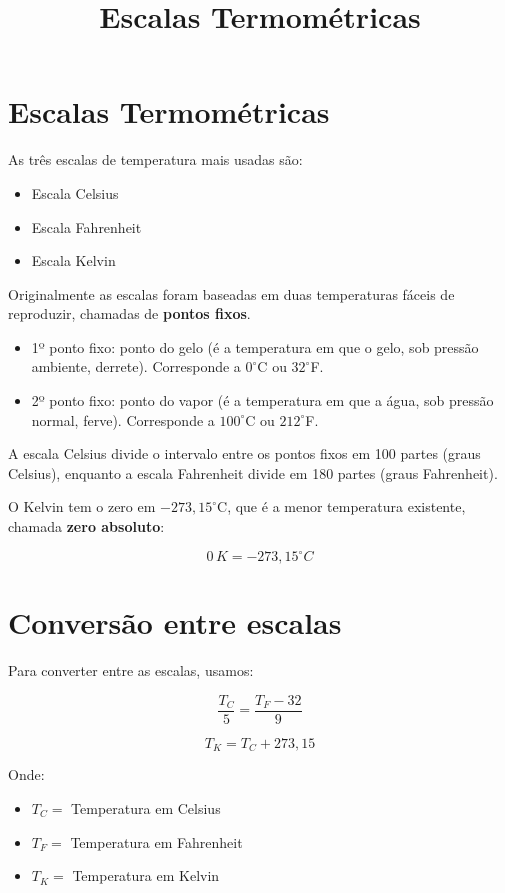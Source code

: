 \documentclass[a4paper,12pt]{article}
\title{Escalas Termométricas}
\author{}
\date{}
\begin{document}
\maketitle

\section*{Escalas Termométricas}

As três escalas de temperatura mais usadas são:
\begin{itemize}
    \item Escala Celsius
    \item Escala Fahrenheit
    \item Escala Kelvin
\end{itemize}

Originalmente as escalas foram baseadas em duas temperaturas fáceis de reproduzir, chamadas de \textbf{pontos fixos}.

\begin{itemize}
    \item 1º ponto fixo: ponto do gelo (é a temperatura em que o gelo, sob pressão ambiente, derrete).  
    Corresponde a $0^\circ$C ou $32^\circ$F.
    \item 2º ponto fixo: ponto do vapor (é a temperatura em que a água, sob pressão normal, ferve).  
    Corresponde a $100^\circ$C ou $212^\circ$F.
\end{itemize}

A escala Celsius divide o intervalo entre os pontos fixos em 100 partes (graus Celsius), enquanto a escala Fahrenheit divide em 180 partes (graus Fahrenheit).  

O Kelvin tem o zero em $-273{,}15^\circ$C, que é a menor temperatura existente, chamada \textbf{zero absoluto}:

\[
0\,K = -273{,}15^\circ C
\]

\section*{Conversão entre escalas}

Para converter entre as escalas, usamos:

\[
\frac{T_C}{5} = \frac{T_F - 32}{9}
\]

\[
T_K = T_C + 273{,}15
\]

Onde:
\begin{itemize}
    \item $T_C =$ Temperatura em Celsius
    \item $T_F =$ Temperatura em Fahrenheit
    \item $T_K =$ Temperatura em Kelvin
\end{itemize}
\end{document}
